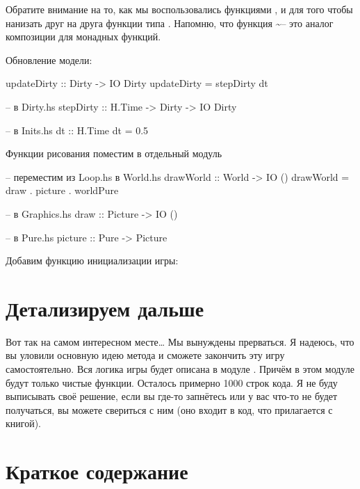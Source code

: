 Обратите внимание на то, как мы воспользовались функциями ,
 и \In{<=<} для того чтобы нанизать друг на друга функции
типа . Напомню, что функция
\In{<=<}\textasciitilde{}-- это аналог композиции для монадных функций.

Обновление модели:


\begin{code}
updateDirty :: Dirty -> IO Dirty
updateDirty = stepDirty dt

-- в Dirty.hs
stepDirty :: H.Time -> Dirty -> IO Dirty

-- в Inits.hs
dt :: H.Time
dt = 0.5
\end{code}

Функции рисования поместим в отдельный модуль 


\begin{code}
-- переместим из Loop.hs в World.hs 
drawWorld :: World -> IO ()
drawWorld = draw . picture . worldPure

-- в Graphics.hs
draw :: Picture -> IO ()

-- в Pure.hs
picture     :: Pure -> Picture
\end{code}

Добавим функцию инициализации игры:



\section{Детализируем дальше}

Вот так на самом интересном месте\ldots{} Мы вынуждены прерваться. Я
надеюсь, что вы уловили основную идею метода и сможете закончить эту
игру самостоятельно. Вся логика игры будет описана в модуле
. Причём в этом модуле будут только чистые функции. Осталось
примерно 1000 строк кода. Я не буду выписывать своё решение, если вы
где-то запнётесь или у вас что-то не будет получаться, вы можете
свериться с ним (оно входит в код, что прилагается с книгой).

\section{Краткое содержание}

